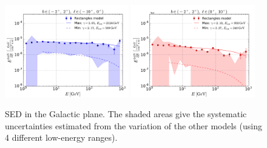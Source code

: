 \begin{figure}[h]
\centering
 \includegraphics[width=0.48\textwidth]{plots/Summary_SED_b=0_l=-5.pdf}
 \includegraphics[width=0.48\textwidth]{plots/Summary_SED_b=0_l=5.pdf}
 \caption{SED in the Galactic plane. The shaded areas give the systematic uncertainties estimated from the variation of the other models (using 4 different low-energy ranges).}
 \label{fig:data_diff}
\end{figure}


